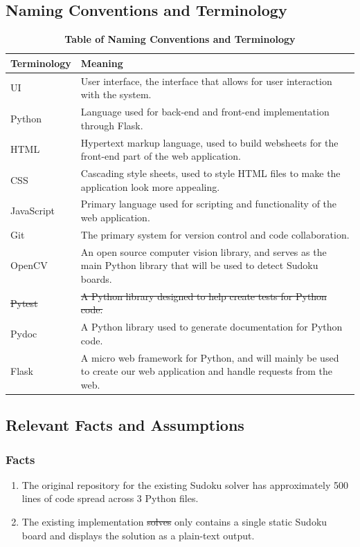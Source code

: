 \documentclass[11pt]{article}
\begin{document}
\subsection{Naming Conventions and Terminology}
\begin{table}[H]
\caption{\bf Table of Naming Conventions and Terminology}
\centering
\begin{tabularx}{\textwidth}{p{3cm}X}
\toprule
Terminology     & Meaning \\
\midrule
UI     & User interface, the interface that allows for user interaction with the system. \\
Python & Language used for back-end and front-end implementation through Flask.\\
HTML & Hypertext markup language, used to build websheets for the front-end part of the web application.\\
CSS & Cascading style sheets, used to style HTML files to make the application look more appealing.\\
JavaScript & Primary language used for scripting and functionality of the web application. \\
Git & The primary system for version control and code collaboration.\\
OpenCV & An open source computer vision library, and serves as the main Python library that will be used to detect Sudoku boards. \\
\sout{Pytest} & \sout{A Python library designed to help create tests for Python code.} \\
Pydoc & A Python library used to generate documentation for Python code. \\
Flask & A micro web framework for Python, and will mainly be used to create our web application and handle requests from the web.\\
\bottomrule
\end{tabularx}
\end{table}
\subsection{Relevant Facts and Assumptions}

\subsubsection{Facts}

\begin{enumerate}
    \item The original repository for the existing Sudoku solver has approximately 500 lines of code spread across 3 Python files.
    \item The existing implementation \sout{solves} only contains a single static Sudoku board and displays the solution as a plain-text output.
\end{enumerate}
\end{document}
